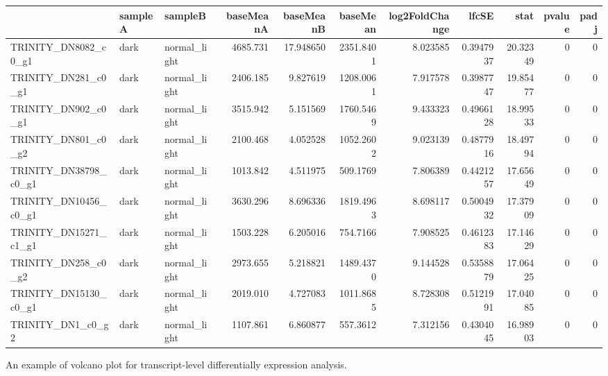 \documentclass[
  letterpaper,
  DIV=11,
  numbers=noendperiod]{scrreprt}
\begin{document}
\begin{table}
\centering\begingroup\fontsize{11}{13}\selectfont

\begin{tabular}{l|l|l|r|r|r|r|r|r|r|r}
\hline
  & sampleA & sampleB & baseMeanA & baseMeanB & baseMean & log2FoldChange & lfcSE & stat & pvalue & padj\\
\hline
TRINITY\_DN8082\_c0\_g1 & dark & normal\_light & 4685.731 & 17.948650 & 2351.8401 & 8.023585 & 0.3947937 & 20.32349 & 0 & 0\\
\hline
TRINITY\_DN281\_c0\_g1 & dark & normal\_light & 2406.185 & 9.827619 & 1208.0061 & 7.917578 & 0.3987747 & 19.85477 & 0 & 0\\
\hline
TRINITY\_DN902\_c0\_g1 & dark & normal\_light & 3515.942 & 5.151569 & 1760.5469 & 9.433323 & 0.4966128 & 18.99533 & 0 & 0\\
\hline
TRINITY\_DN801\_c0\_g2 & dark & normal\_light & 2100.468 & 4.052528 & 1052.2602 & 9.023139 & 0.4877916 & 18.49794 & 0 & 0\\
\hline
TRINITY\_DN38798\_c0\_g1 & dark & normal\_light & 1013.842 & 4.511975 & 509.1769 & 7.806389 & 0.4421257 & 17.65649 & 0 & 0\\
\hline
TRINITY\_DN10456\_c0\_g1 & dark & normal\_light & 3630.296 & 8.696336 & 1819.4963 & 8.698117 & 0.5004932 & 17.37909 & 0 & 0\\
\hline
TRINITY\_DN15271\_c1\_g1 & dark & normal\_light & 1503.228 & 6.205016 & 754.7166 & 7.908525 & 0.4612383 & 17.14629 & 0 & 0\\
\hline
TRINITY\_DN258\_c0\_g2 & dark & normal\_light & 2973.655 & 5.218821 & 1489.4370 & 9.144528 & 0.5358879 & 17.06425 & 0 & 0\\
\hline
TRINITY\_DN15130\_c0\_g1 & dark & normal\_light & 2019.010 & 4.727083 & 1011.8685 & 8.728308 & 0.5121991 & 17.04085 & 0 & 0\\
\hline
TRINITY\_DN1\_c0\_g2 & dark & normal\_light & 1107.861 & 6.860877 & 557.3612 & 7.312156 & 0.4304045 & 16.98903 & 0 & 0\\
\hline
\end{tabular}
\endgroup{}
\end{table}

An example of volcano plot for transcript-level differentially
expression analysis.
\end{document}
